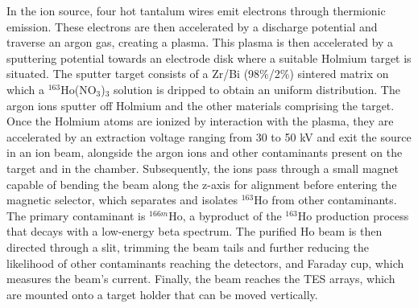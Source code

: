 In the ion source, four hot tantalum wires emit electrons through thermionic emission. These electrons are then
accelerated by a discharge potential and traverse an argon gas, creating a plasma. This plasma is then accelerated by a sputtering potential towards an electrode disk where a suitable Holmium target is situated.
The sputter target consists of a Zr/Bi (98\%/2\%) sintered matrix on which a 
$^{163}$Ho(NO$_3$)$_3$ solution is dripped to obtain an uniform distribution.
The argon ions sputter off Holmium and the other materials comprising the target. Once the Holmium atoms are
ionized by interaction with the plasma, they are accelerated by an extraction voltage ranging from 30 to 50 kV and exit the source in an ion beam, alongside the argon ions and other contaminants present on the target and in the chamber.
Subsequently, the ions pass through a small magnet capable of bending the beam along the z-axis for alignment before
entering the magnetic selector, which separates and isolates $^{163}$Ho from
other contaminants. The primary contaminant is $^{166m}$Ho, a byproduct of the $^{163}$Ho production process that decays with a
low-energy beta spectrum.
The purified Ho beam is then directed through a slit, trimming the beam tails and further reducing the likelihood of
other contaminants reaching the detectors, and Faraday cup, which measures the beam's current. Finally, the beam
reaches the TES arrays, which are mounted onto a target holder that can be moved vertically.

